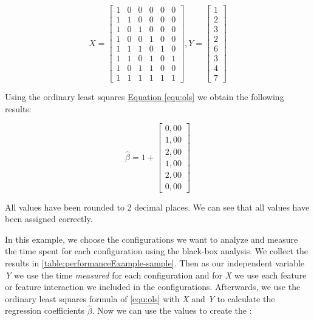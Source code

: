 \begin{equation}\label{equ:exampleIndependentDependent}
    \textit{X} = 
    \begin{bmatrix} 
        1 & 0 & 0 & 0 & 0 & 0 \\
        1 & 1 & 0 & 0 & 0 & 0 \\
        1 & 0 & 1 & 0 & 0 & 0 \\
        1 & 0 & 0 & 1 & 0 & 0 \\
        1 & 1 & 1 & 0 & 1 & 0 \\
        1 & 1 & 0 & 1 & 0 & 1 \\
        1 & 0 & 1 & 1 & 0 & 0 \\
        1 & 1 & 1 & 1 & 1 & 1 
      \end{bmatrix}
      ,
      \textit{Y} =
      \begin{bmatrix}
        1 \\
        2 \\
        3 \\
        2 \\
        6 \\
        3 \\
        4 \\
        7 
      \end{bmatrix}
\end{equation}


Using the ordinary least squares \hyperref[equ:ols]{Equation \ref*{equ:ols}}  we obtain the following results:

\begin{equation}
    \hat{\beta} = 1 + 
    \begin{bmatrix}
        0,00 \\
        1,00 \\
        2,00 \\
        1,00 \\
        2,00 \\
        0,00
    \end{bmatrix}
\end{equation}

All values have been rounded to 2 decimal places. We can see that all values have been assigned correctly.

In this example, we choose the configurations we want to analyze and measure the time spent for each configuration using the black-box analysis. 
We collect the results in \autoref{table:performanceExample-sample}. 
Then as our independent variable \textit{Y} we use the time \textit{measured} for each configuration 
and for \textit{X} we use each feature or feature interaction we included in the configurations. 
Afterwards, we use the ordinary least squares formula of \autoref{equ:ols} with \textit{X} and \textit{Y} to calculate the regression coefficients $\hat{\beta}$. 
Now we can use the values to create the \perfInfluenceModel:

